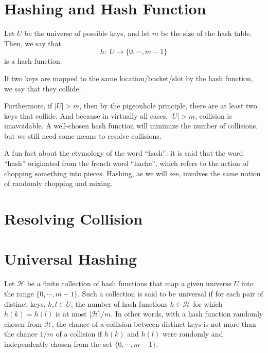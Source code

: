 \section{Hashing and Hash Function}

Let $U$ be the universe of possible keys, and let $m$ be the size of the hash table. Then, we say that
$$
h:\; U \to \{0, \cdots, m-1 \}
$$
is a hash function.

If two keys are mapped to the same location/bucket/slot by the hash function, we say that they collide.

Furthermore, if $|U| > m$, then by the pigeonhole principle, there are at least two keys that collide. And because in virtually all cases, $|U| > m$, collision is unavoidable. A well-chosen hash function will minimize the number of collisions, but we still need some means to resolve collisions.

\begin{remark}
    A fun fact about the etymology of the word ``hash'': it is said that the word ``hash'' originated from the french word ``hache'', which refers to the action of chopping something into pieces. Hashing, as we will see, involves the same notion of randomly chopping and mixing.
\end{remark}

\section{Resolving Collision}

\section{Universal Hashing}

Let $\mathcal{H}$ be a finite collection of hash functions that map a given universe $U$ into the range $\{0,\cdots,m-1\}$. Such a collection is said to be universal if for each pair of distinct keys, $k,l \in U$, the number of hash functions $h \in \mathcal{H}$ for which $h(k) = h(l)$ is at most $|\mathcal{H}|/m$. In other words, with a hash function randomly chosen from $\mathcal{H}$, the chance of a collision between distinct keys is not more than the chance $1/m$ of a collision if $h(k)$ and $h(l)$ were randomly and independently chosen from the set $\{0,\cdots,m-1\}$. 
